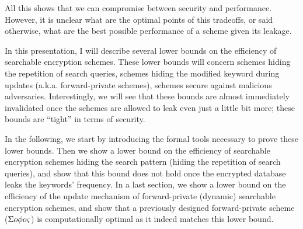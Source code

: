 All this shows that we can compromise between security and performance. 
However, it is unclear what are the optimal points of this tradeoffs, or said otherwise, what are the best possible performance of a scheme given its leakage.

\medskip

In this presentation, I will describe several lower bounds on the efficiency of searchable encryption schemes.
These lower bounds will concern schemes hiding the repetition of search queries, schemes hiding the modified keyword during updates (a.k.a. forward-private schemes), schemes secure against malicious adversaries.
Interestingly, we will see that these bounds are almost immediately invalidated once the schemes are allowed to leak even just a little bit more; these bounds are ``tight'' in terms of security. 

In the following, we start by introducing the formal tools necessary to prove these lower bounds.
Then we show a lower bound on the efficiency of searchable encryption schemes hiding the search pattern (hiding the repetition of search queries), and show that this bound does not hold once the encrypted database leaks the keywords' frequency.
In a last section, we show a lower bound on the efficiency of the update mechanism of forward-private (dynamic) searchable encryption schemes, and show that a previously designed forward-private scheme (${\Sigma o\phi o\varsigma}$) is computationally optimal as it indeed matches this lower bound.



